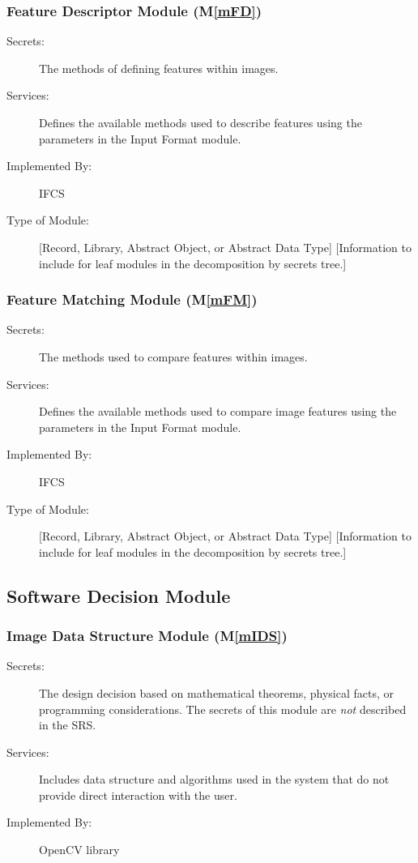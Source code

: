 \documentclass[12pt, titlepage]{article}
\newcommand{\mref}[1]{M\ref{#1}}
\begin{document}
\subsubsection{Feature Descriptor Module (\mref{mFD})}

\begin{description}
\item[Secrets:]The methods of defining features within images.
\item[Services:]Defines the available methods used to describe features using the parameters 
in the Input Format module.
\item[Implemented By:] IFCS
\item[Type of Module:] [Record, Library, Abstract Object, or Abstract Data Type]
  [Information to include for leaf modules in the decomposition by secrets tree.]
\end{description}

\subsubsection{Feature Matching Module (\mref{mFM})}

\begin{description}
\item[Secrets:]The methods used to compare features within images.
\item[Services:]Defines the available methods used to compare image features using the 
parameters in the Input Format module.
\item[Implemented By:] IFCS
\item[Type of Module:] [Record, Library, Abstract Object, or Abstract Data Type]
  [Information to include for leaf modules in the decomposition by secrets tree.]
\end{description}


\subsection{Software Decision Module}

\subsubsection{Image Data Structure Module (\mref{mIDS})}
\begin{description}
\item[Secrets:] The design decision based on mathematical theorems, physical
  facts, or programming considerations. The secrets of this module are
  \emph{not} described in the SRS.
\item[Services:] Includes data structure and algorithms used in the system that
  do not provide direct interaction with the user. 
\item[Implemented By:] OpenCV library
\end{description}
\end{document}
